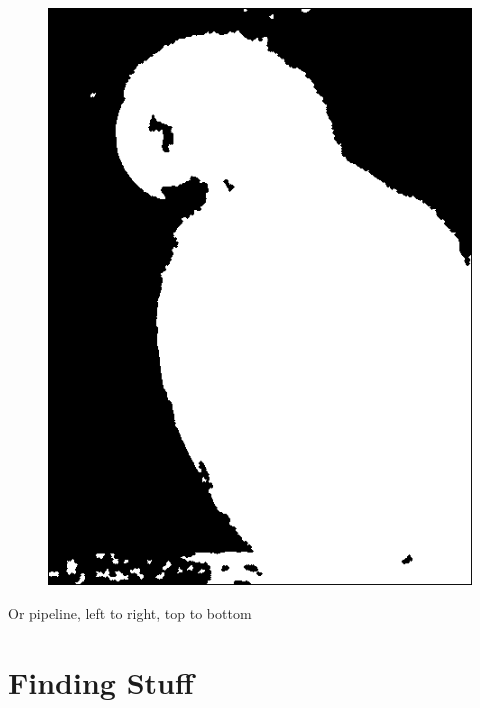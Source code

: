 \documentclass{beamer}
\begin{document}
\begin{frame}
\begin{figure}
     \quad
     \includegraphics[width=0.15\linewidth]{watershedparrot.png}
 \end{figure}

\tiny{Or pipeline, left to right, top to bottom}
\end{frame}

\section{Finding Stuff}

\end{document}
